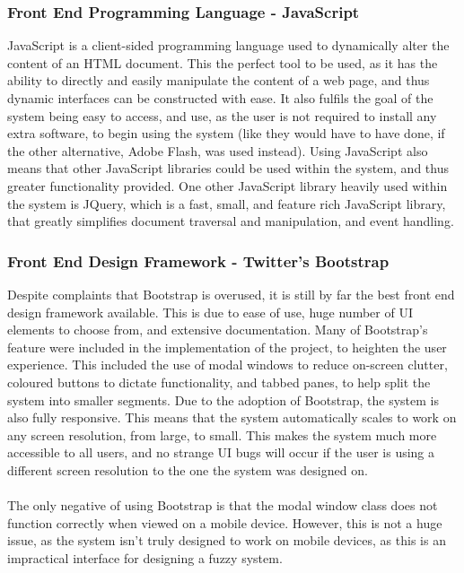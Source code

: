 \tocless\subsubsection{Front End Programming Language - JavaScript}
JavaScript is a client-sided programming language used to dynamically alter the content of an HTML document. This the perfect tool to be used, as it has the ability to directly and easily manipulate the content of a web page, and thus dynamic interfaces can be constructed with ease. It also fulfils the goal of the system being easy to access, and use, as the user is not required to install any extra software, to begin using the system (like they would have to have done, if the other alternative, Adobe Flash, was used instead). Using JavaScript also means that other JavaScript libraries could be used within the system, and thus greater functionality provided. One other JavaScript library heavily used within the system is JQuery, which is a fast, small, and feature rich JavaScript library, that greatly simplifies document traversal and manipulation, and event handling.

\tocless\subsubsection{Front End Design Framework - Twitter's Bootstrap}
Despite complaints that Bootstrap is overused, it is still by far the best front end design framework available. This is due to ease of use, huge number of UI elements to choose from, and extensive documentation. Many of Bootstrap's feature were included in the implementation of the project, to heighten the user experience. This included the use of modal windows to reduce on-screen clutter, coloured buttons to dictate functionality, and tabbed panes, to help split the system into smaller segments. Due to the adoption of Bootstrap, the system is also fully responsive. This means that the system automatically scales to work on any screen resolution, from large, to small. This makes the system much more accessible to all users, and no strange UI bugs will occur if the user is using a different screen resolution to the one the system was designed on. \ \\
\ \\
The only negative of using Bootstrap is that the modal window class does not function correctly when viewed on a mobile device. However, this is not a huge issue, as the system isn't truly designed to work on mobile devices, as this is an impractical interface for designing a fuzzy system. 

